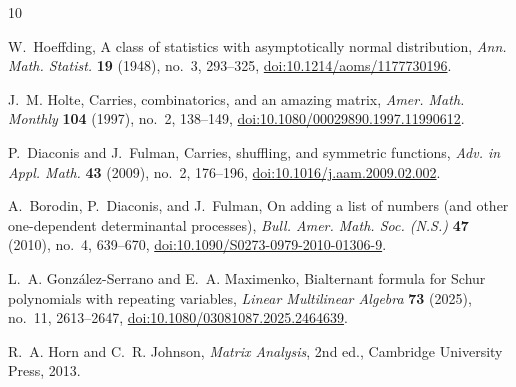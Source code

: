 \documentclass[11pt]{amsart}
\newcommand{\1}{\mathbf 1}
\theoremstyle{remark}
\begin{document}
\begin{thebibliography}{10}

W.~Hoeffding,
A class of statistics with asymptotically normal distribution,
\emph{Ann. Math. Statist.} \textbf{19} (1948), no.~3, 293--325,
\href{https://doi.org/10.1214/aoms/1177730196}{doi:10.1214/aoms/1177730196}.

J.~M. Holte,
Carries, combinatorics, and an amazing matrix,
\emph{Amer. Math. Monthly} \textbf{104} (1997), no.~2, 138--149,
\href{https://doi.org/10.1080/00029890.1997.11990612}{doi:10.1080/00029890.1997.11990612}.

P.~Diaconis and J.~Fulman,
Carries, shuffling, and symmetric functions,
\emph{Adv. in Appl. Math.} \textbf{43} (2009), no.~2, 176--196,
\href{https://doi.org/10.1016/j.aam.2009.02.002}{doi:10.1016/j.aam.2009.02.002}.

A.~Borodin, P.~Diaconis, and J.~Fulman,
On adding a list of numbers (and other one-dependent determinantal processes),
\emph{Bull. Amer. Math. Soc. (N.S.)} \textbf{47} (2010), no.~4, 639--670,
\href{https://doi.org/10.1090/S0273-0979-2010-01306-9}{doi:10.1090/S0273-0979-2010-01306-9}.

L.~A. Gonz\'alez-Serrano and E.~A. Maximenko,
Bialternant formula for Schur polynomials with repeating variables,
\emph{Linear Multilinear Algebra} \textbf{73} (2025), no.~11, 2613--2647,
\href{https://doi.org/10.1080/03081087.2025.2464639}{doi:10.1080/03081087.2025.2464639}.

R.~A. Horn and C.~R. Johnson,
\emph{Matrix Analysis}, 2nd ed., Cambridge University Press, 2013.

\end{thebibliography}
\end{document}
